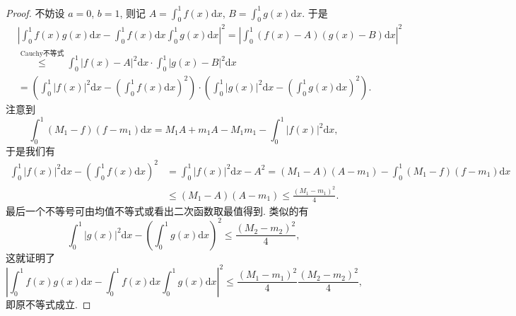\documentclass[../../main.tex]{subfiles}%
\begin{document}
\begin{proof}

不妨设 $a = 0$, $b = 1$, 则记 $A = \int_{0}^{1}f(x)\mathrm{d}x$, $B = \int_{0}^{1}g(x)\mathrm{d}x$. 于是
\begin{align*}
&\left|\int_{0}^{1}f(x)g(x)\mathrm{d}x - \int_{0}^{1}f(x)\mathrm{d}x\int_{0}^{1}g(x)\mathrm{d}x\right|^2 = \left|\int_{0}^{1}(f(x) - A)(g(x) - B)\mathrm{d}x\right|^2
\\
&\stackrel{\hyperref[theorem:Cauchy积分不等式]{\text{Cauchy不等式}}}{\leqslant } \int_{0}^{1}|f(x) - A|^2\mathrm{d}x \cdot \int_{0}^{1}|g(x) - B|^2\mathrm{d}x
\\
&= \left(\int_{0}^{1}|f(x)|^2\mathrm{d}x - \left(\int_{0}^{1}f(x)\mathrm{d}x\right)^2\right) \cdot \left(\int_{0}^{1}|g(x)|^2\mathrm{d}x - \left(\int_{0}^{1}g(x)\mathrm{d}x\right)^2\right).
\end{align*}
注意到
\[
\int_{0}^{1}(M_1 - f)(f - m_1)\mathrm{d}x = M_1A + m_1A - M_1m_1 - \int_{0}^{1}|f(x)|^2\mathrm{d}x,
\]
于是我们有
\begin{align*}
\int_{0}^{1}|f(x)|^2\mathrm{d}x - \left(\int_{0}^{1}f(x)\mathrm{d}x\right)^2 &=\int_{0}^{1}|f(x)|^2\mathrm{d}x -A^2
= (M_1 - A)(A - m_1) - \int_{0}^{1}(M_1 - f)(f - m_1)\mathrm{d}x\\
&\leqslant  (M_1-A)(A-m_1)\leqslant  \frac{(M_1-m_1)^2}{4}.
\end{align*}
最后一个不等号可由均值不等式或看出二次函数取最值得到.
类似的有
\[
\int_{0}^{1}|g(x)|^2\mathrm{d}x - \left(\int_{0}^{1}g(x)\mathrm{d}x\right)^2 \leqslant  \frac{(M_2 - m_2)^2}{4},
\]
这就证明了
\[
\left|\int_{0}^{1}f(x)g(x)\mathrm{d}x - \int_{0}^{1}f(x)\mathrm{d}x\int_{0}^{1}g(x)\mathrm{d}x\right|^2 \leqslant  \frac{(M_1 - m_1)^2}{4}\frac{(M_2 - m_2)^2}{4},
\]
即原不等式成立. 

\end{proof}
\end{document}
